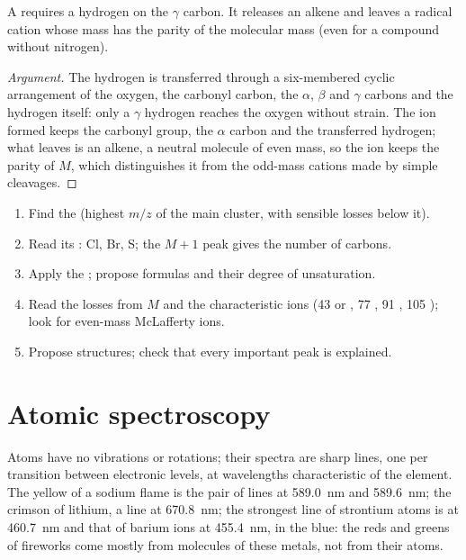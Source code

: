 \begin{proposition}\label{prop:b2:mass-spec-atomic:mclafferty}
A  requires a hydrogen on the $\gamma$ carbon. It releases an alkene and leaves
a radical cation whose mass has the parity of the molecular mass (even for a compound without
nitrogen).
\end{proposition}

\begin{proof}[Argument]
The hydrogen is transferred through a six-membered cyclic arrangement of the oxygen, the carbonyl
carbon, the $\alpha$, $\beta$ and $\gamma$ carbons and the hydrogen itself: only a $\gamma$ hydrogen
reaches the oxygen without strain. The ion formed keeps the carbonyl group, the $\alpha$ carbon and the
transferred hydrogen; what leaves is an alkene, a neutral molecule of even mass, so the ion keeps the
parity of $M$, which distinguishes it from the odd-mass cations made by simple cleavages.
\end{proof}

\begin{method}\label{met:b2:mass-spec-atomic:read-ms}
\begin{enumerate}
  \item Find the  (highest $m/z$ of the main cluster, with sensible losses below it).
  \item Read its : Cl, Br, S; the $M+1$ peak gives the number of carbons.
  \item Apply the ; propose formulas and their degree of unsaturation.
  \item Read the losses from $M$ and the characteristic ions (43  or , 77
        , 91 , 105 ); look for even-mass McLafferty ions.
  \item Propose structures; check that every important peak is explained.
\end{enumerate}
\end{method}

\section{Atomic spectroscopy}

Atoms have no vibrations or rotations; their spectra are sharp lines, one per transition between
electronic levels, at wavelengths characteristic of the element. The yellow of a sodium flame is the
pair of lines at \qty{589.0}{nm} and \qty{589.6}{nm}; the crimson of lithium, a line at \qty{670.8}{nm};
the strongest line of strontium atoms is at \qty{460.7}{nm} and that of barium ions at
\qty{455.4}{nm}, in the blue: the reds and greens of fireworks come mostly from molecules of these
metals, not from their atoms.

